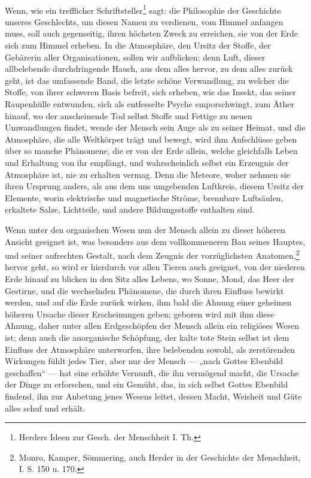 \documentclass[a4paper, 11pt, oneside, polutonikogreek, german]{article}
\begin{document}
\paragraph{}
Wenn, wie ein trefflicher Schriftsteller\footnote{Herders Ideen zur Gesch. der Menschheit I. Th.} sagt: die Philosophie der Geschichte unseres Geschlechts, um diesen Namen zu verdienen, vom Himmel anfangen muss, soll auch gegenseitig, ihren höchsten Zweck zu erreichen, sie von der Erde sich zum Himmel erheben. In die Atmosphäre, den Ursitz der Stoffe, der Gebärerin aller Organisationen, sollen wir aufblicken; denn Luft, dieser allbelebende durchdringende Hauch, aus dem alles hervor, zu dem alles zurück geht, ist das umfassende Band, die letzte schöne Verwandlung, zu welcher die Stoffe, von ihrer schweren Basis befreit, sich erheben, wie das Insekt, das seiner Raupenhülle entwunden, sich als entfesselte Psyche emporschwingt, zum Äther hinauf, wo der anscheinende Tod selbst Stoffe und Fettige zu neuen Umwandlungen findet, wende der Mensch sein Auge als zu seiner Heimat, und die Atmosphäre, die alle Weltkörper trägt und bewegt, wird ihm Aufschlüsse geben über so manche Phänomene, die er von der Erde allein, welche gleichfalls Leben und Erhaltung von ihr empfängt, und wahrscheinlich selbst ein Erzeugnis der Atmosphäre ist, nie zu erhalten vermag. Denn die Meteore, woher nehmen sie ihren Ursprung anders, als aus dem uns umgebenden Luftkreis, diesem Ursitz der Elemente, worin elektrische und magnetische Ströme, brennbare Luftsäulen, erkaltete Salze, Lichtteile, und andere Bildungsstoffe enthalten sind.

Wenn unter den organischen Wesen nun der Mensch allein zu dieser höheren Ansicht geeignet ist, was besonders aus dem vollkommeneren Bau seines Hauptes, und seiner aufrechten Gestalt, nach dem Zeugnis der vorzüglichsten Anatomen,\footnote{Monro, Kamper, Sömmering, auch Herder in der Geschichte der Menschheit, I. S. 150 u. 170.} hervor geht, so wird er hierdurch vor allen Tieren auch geeignet, von der niederen Erde hinauf zu blicken in den Sitz alles Lebens, wo Sonne, Mond, das Heer der Gestirne, und die wechselnden Phänomene, die durch ihren Einfluss bewirkt werden, und auf die Erde zurück wirken, ihm bald die Ahnung einer geheimen höheren Ursache dieser Erscheinungen geben; geboren wird mit ihm diese Ahnung, daher unter allen Erdgeschöpfen der Mensch allein ein religiöses Wesen ist; denn auch die anorganische Schöpfung, der kalte tote Stein selbst ist dem Einfluss der Atmosphäre unterworfen, ihre belebenden sowohl, als zerstörenden Wirkungen fühlt jedes Tier, aber nur der Mensch --- „nach Gottes Ebenbild geschaffen“ --- hat eine erhöhte Vernunft, die ihn vermögend macht, die Ursache der Dinge zu erforschen, und ein Gemüht, das, in sich selbst Gottes Ebenbild findend, ihn zur Anbetung jenes Wesens leitet, dessen Macht, Weisheit und Güte alles schuf und erhält.
\end{document}
